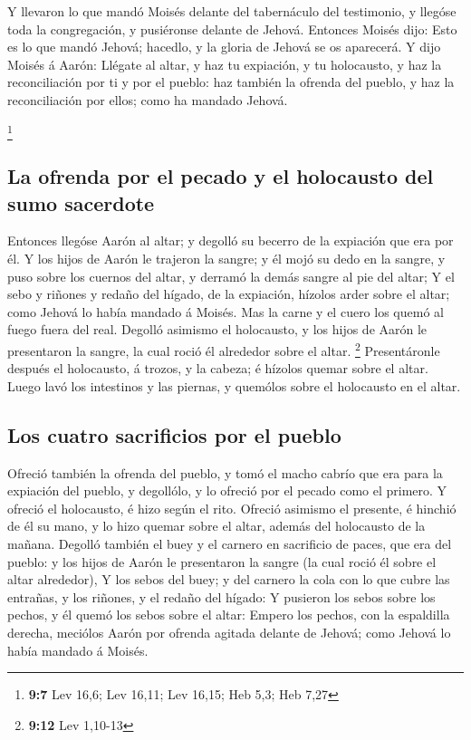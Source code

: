  Y llevaron lo que mandó Moisés delante del tabernáculo
del testimonio, y llegóse toda la congregación, y pusiéronse delante de
Jehová.  Entonces Moisés dijo: Esto es lo que mandó
Jehová; hacedlo, y la gloria de Jehová se os aparecerá.  Y
dijo Moisés á Aarón: Llégate al altar, y haz tu expiación, y tu
holocausto, y haz la reconciliación por ti y por el pueblo: haz también
la ofrenda del pueblo, y haz la reconciliación por ellos; como ha
mandado Jehová.

\footnote{\textbf{9:7} Lev 16,6; Lev 16,11; Lev 16,15; Heb 5,3; Heb 7,27}

\hypertarget{la-ofrenda-por-el-pecado-y-el-holocausto-del-sumo-sacerdote}{%
\subsection{La ofrenda por el pecado y el holocausto del sumo
sacerdote}\label{la-ofrenda-por-el-pecado-y-el-holocausto-del-sumo-sacerdote}}

 Entonces llegóse Aarón al altar; y degolló su becerro de
la expiación que era por él.  Y los hijos de Aarón le
trajeron la sangre; y él mojó su dedo en la sangre, y puso sobre los
cuernos del altar, y derramó la demás sangre al pie del altar;
 Y el sebo y riñones y redaño del hígado, de la
expiación, hízolos arder sobre el altar; como Jehová lo había mandado á
Moisés.  Mas la carne y el cuero los quemó al fuego fuera
del real.  Degolló asimismo el holocausto, y los hijos de
Aarón le presentaron la sangre, la cual roció él alrededor sobre el
altar. \footnote{\textbf{9:12} Lev 1,10-13} 
Presentáronle después el holocausto, á trozos, y la cabeza; é hízolos
quemar sobre el altar.  Luego lavó los intestinos y las
piernas, y quemólos sobre el holocausto en el altar.

\hypertarget{los-cuatro-sacrificios-por-el-pueblo}{%
\subsection{Los cuatro sacrificios por el
pueblo}\label{los-cuatro-sacrificios-por-el-pueblo}}

 Ofreció también la ofrenda del pueblo, y tomó el macho
cabrío que era para la expiación del pueblo, y degollólo, y lo ofreció
por el pecado como el primero.  Y ofreció el holocausto,
é hizo según el rito.  Ofreció asimismo el presente, é
hinchió de él su mano, y lo hizo quemar sobre el altar, además del
holocausto de la mañana.  Degolló también el buey y el
carnero en sacrificio de paces, que era del pueblo: y los hijos de Aarón
le presentaron la sangre (la cual roció él sobre el altar alrededor),
 Y los sebos del buey; y del carnero la cola con lo que
cubre las entrañas, y los riñones, y el redaño del hígado:
 Y pusieron los sebos sobre los pechos, y él quemó los
sebos sobre el altar:  Empero los pechos, con la
espaldilla derecha, meciólos Aarón por ofrenda agitada delante de
Jehová; como Jehová lo había mandado á Moisés.

